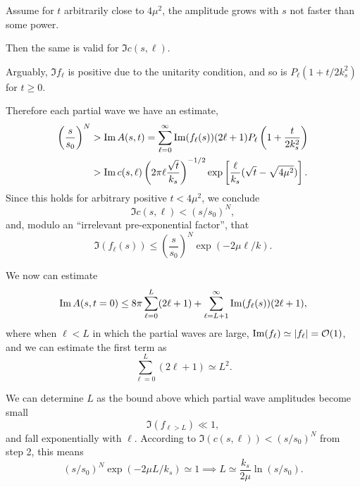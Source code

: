 Assume for $t$ arbitrarily close to $4\mu^{2}$, the amplitude grows with
$s$ not faster than some power.

Then the same is valid for $\Im c(s,\ell)$.

Arguably, $\Im f_{\ell}$ is positive due to the unitarity condition, and
so is $P_{\ell}(1 + t/2k_{s}^{2})$ for $t\geq 0$.

Therefore each partial wave we have an estimate,
\begin{subequations}
  \begin{align}
    \left(\frac{s}{s_{0}}\right)^{N}
    &>\operatorname{Im}A(s,t) = \sum^{\infty}_{\ell=0}\operatorname{Im}(f_{\ell}(s))(2\ell+1)P_{\ell}\left(1+\frac{t}{2k_{s}^{2}}\right)\\
    &>\operatorname{Im} c(s,\ell)\left(2\pi\ell\frac{\sqrt{t}}{k_{s}}\right)^{-1/2}\exp\left[\frac{\ell}{k_{s}}(\sqrt{t}-\sqrt{4\mu^{2}})\right].
  \end{align}
\end{subequations}
Since this holds for arbitrary positive $t<4\mu^{2}$, we conclude
\begin{equation}
\Im c(s,\ell) < (s/s_{0})^{N},
\end{equation}
and, modulo an ``irrelevant pre-exponential factor'', that
\begin{equation}
\Im(f_{\ell}(s))\leq\left(\frac{s}{s_{0}}\right)^{N}\exp(-2\mu\ell/k).
\end{equation}

We now can estimate
\begin{equation}
\operatorname{Im}A(s,t=0)\leq8\pi\sum^{L}_{\ell=0}(2\ell+1) + \sum^{\infty}_{\ell=L+1}\operatorname{Im}(f_{\ell}(s))(2\ell+1),
\end{equation}
where when $\ell<L$ in which the partial waves are large,
$\operatorname{Im}(f_{\ell})\simeq|f_{\ell}|=\mathcal{O}(1)$, and we can estimate the first
term as
\begin{equation}
\sum^{L}_{\ell=0}(2\ell+1)\simeq L^{2}.
\end{equation}

We can determine $L$ as the bound above which partial wave amplitudes
become small
\begin{equation}
\Im(f_{\ell>L})\ll 1,
\end{equation}
and fall exponentially with $\ell$. According to
$\Im(c(s,\ell))<(s/s_{0})^{N}$ from step 2, this means
\begin{equation}
(s/s_{0})^{N}\exp(-2\mu L/k_{s})\simeq1\implies \boxed{L\simeq\frac{k_{s}}{2\mu}\ln(s/s_{0}).}
\end{equation}

